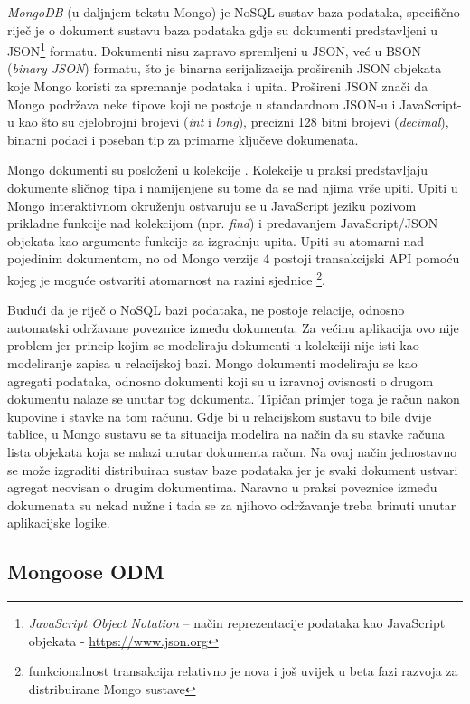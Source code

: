 \documentclass[times, utf8, diplomski, numeric]{fer}
\newcommand{\razmaks}{\vspace{10pt}}
\begin{document}
\emph{MongoDB} (u daljnjem tekstu Mongo) je NoSQL sustav baza podataka, specifično riječ je o dokument sustavu baza podataka gdje su dokumenti predstavljeni u JSON\footnote{
    \emph{JavaScript Object Notation} – način reprezentacije podataka kao JavaScript objekata - \url{https://www.json.org}
} formatu.
Dokumenti nisu zapravo spremljeni u JSON, već u BSON (\emph{binary JSON}) formatu, što je binarna serijalizacija proširenih JSON objekata koje Mongo koristi za spremanje podataka i upita.
Prošireni JSON znači da Mongo podržava neke tipove koji ne postoje u standardnom JSON-u i JavaScript-u kao što su cjelobrojni brojevi (\emph{int} i \emph{long}), precizni 128 bitni brojevi (\emph{decimal}), binarni podaci i poseban tip za primarne ključeve dokumenata.

Mongo dokumenti su posloženi u kolekcije .
Kolekcije u praksi predstavljaju dokumente sličnog tipa i namijenjene su tome da se nad njima vrše upiti.
Upiti u Mongo interaktivnom okruženju ostvaruju se u JavaScript jeziku pozivom prikladne funkcije nad kolekcijom (npr. \emph{find}) i predavanjem JavaScript/JSON objekata kao argumente funkcije za izgradnju upita. Upiti su atomarni  nad pojedinim dokumentom, no od Mongo verzije 4 postoji transakcijski API pomoću kojeg je moguće ostvariti atomarnost na razini sjednice \footnote{
    funkcionalnost transakcija relativno je nova i još uvijek u beta fazi razvoja za distribuirane Mongo sustave
}\citep{mongo}.

Budući da je riječ o NoSQL bazi podataka, ne postoje relacije, odnosno automatski održavane poveznice između dokumenta.
Za većinu aplikacija ovo nije problem jer princip kojim se modeliraju dokumenti u kolekciji nije isti kao modeliranje zapisa u relacijskoj bazi.
Mongo dokumenti modeliraju se kao agregati podataka, odnosno dokumenti koji su u izravnoj ovisnosti o drugom dokumentu nalaze se unutar tog dokumenta.
Tipičan primjer toga je račun nakon kupovine i stavke na tom računu.
Gdje bi u relacijskom sustavu to bile dvije tablice, u Mongo sustavu se ta situacija modelira na način da su stavke računa lista objekata koja se nalazi unutar dokumenta račun.
Na ovaj način jednostavno se može izgraditi distribuiran sustav baze podataka jer je svaki dokument ustvari agregat neovisan o drugim dokumentima.
Naravno u praksi poveznice između dokumenata su nekad nužne i tada se za njihovo održavanje treba brinuti unutar aplikacijske logike.


\razmaks
\subsection{Mongoose ODM}
\end{document}
